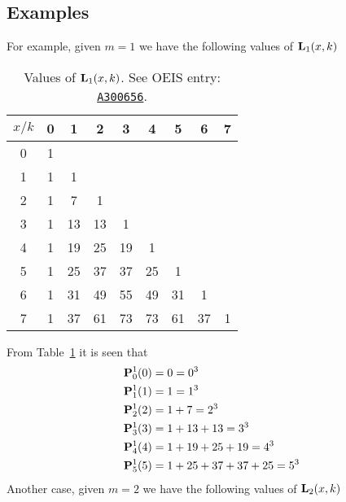 \subsection{Examples} \label{subsec:examples}
For example, given $m=1$ we have the following values of ${\mathbf{L}}\sb{1}(x,k)$
\begin{table}[H]
    \begin{tabular}{c|cccccccc}
        $x/k$ & 0 & 1  & 2  & 3  & 4  & 5  & 6  & 7 \\[3px]
        \hline
        0     & 1 &    &    &    &    &    &    &   \\
        1     & 1 & 1  &    &    &    &    &    &   \\
        2     & 1 & 7  & 1  &    &    &    &    &   \\
        3     & 1 & 13 & 13 & 1  &    &    &    &   \\
        4     & 1 & 19 & 25 & 19 & 1  &    &    &   \\
        5     & 1 & 25 & 37 & 37 & 25 & 1  &    &   \\
        6     & 1 & 31 & 49 & 55 & 49 & 31 & 1  &   \\
        7     & 1 & 37 & 61 & 73 & 73 & 61 & 37 & 1
    \end{tabular}
    \caption{Values of ${\mathbf{L}}\sb{1}(x,k)$. See OEIS entry: \href{https://oeis.org/A300656}{\texttt{A300656}}.}
    \label{tab:tab_3}
\end{table}
From Table~\ref{tab:tab_3} it is seen that
\begin{equation*}
    \begin{split}
        {\mathbf{P}}\sp{1} \sb{0}(0) &= 0 = 0^3 \\
        {\mathbf{P}}\sp{1} \sb{1}(1) &= 1 = 1^3 \\
        {\mathbf{P}}\sp{1} \sb{2}(2) &= 1+7 = 2^3 \\
        {\mathbf{P}}\sp{1} \sb{3}(3) &= 1+13+13 = 3^3 \\
        {\mathbf{P}}\sp{1} \sb{4}(4) &= 1+19+25+19 = 4^3 \\
        {\mathbf{P}}\sp{1} \sb{5}(5) &= 1+25+37+37+25 = 5^3
    \end{split}
\end{equation*}
Another case, given $m=2$ we have the following values of ${\mathbf{L}}\sb{2}(x,k)$
